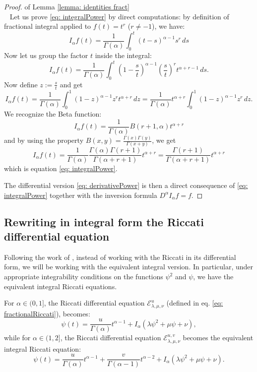 \documentclass[a4paper,italian,11pt]{book}
\theoremstyle{plain}
\theoremstyle{remark}
\theoremstyle{plain}
\begin{document}
\begin{proof} of Lemma \ref{lemma: identities fract}
\\\
\noindent
Let us prove \eqref{eq: integralPower} by direct computations:
by definition of fractional integral applied to $f(t)= t^r$ ($r \ne -1$), we have:
\begin{equation}
    \label{eq: UseleSSSforThen}
    I_\alpha f(t) = \frac{1}{\Gamma(\alpha)} \int_0^t (t-s)^{\alpha-1} s^r \, ds
\end{equation}
Now let us group the factor $t$ inside the integral:
$$ I_\alpha f(t) = \frac{1}{\Gamma(\alpha)} \int_0^t \left(1-\frac{s}{t} \right)^{\alpha-1} \left( \frac{s}{t} \right) ^r t^{\alpha+r-1}\, ds . $$
Now define $z:=\frac{s}{t}$ and get
$$ I_\alpha f(t) = \frac{1}{\Gamma(\alpha)} \int_0^1 (1-z)^{\alpha-1} z^r t^{\alpha+r} \, dz = \frac{1}{\Gamma(\alpha)}  t^{\alpha+r} \int_0^1 (1-z)^{\alpha-1} z^r \, dz.$$
We recognize the Beta function:
$$ I_\alpha f(t) = \frac{1}{\Gamma(\alpha)} B(r + 1, \alpha) t^{\alpha+r}$$
and by using the property $B(x,y) = \frac{\Gamma(x) \Gamma(y)}{\Gamma(x+y)}$, we get
$$ I_\alpha f(t) = \frac{1}{\Gamma(\alpha)} \frac{\Gamma(\alpha) \Gamma(r+1)}{\Gamma(\alpha+r+1)} t^{\alpha+r} = \frac{\Gamma(r+1)}{\Gamma(\alpha +r +1)} t^{\alpha+r}  $$
which is equation \eqref{eq: integralPower}.

The differential version \eqref{eq: derivativePower} is then a direct consequence of \eqref{eq: integralPower} together with the inversion formula $D^\alpha I_\alpha f = f$. 

\end{proof}

\subsection{Rewriting in integral form the Riccati differential equation}

Following the work of \cite{Main}, instead of working with the Riccati in its differential form, we will be working with the equivalent integral version. 
In particular, under appropriate integrability conditions on the functions $\psi^2$ and $\psi$, we have the equivalent integral Riccati equations.

For $\alpha \in (0,1]$, the Riccati differential equation $\mathcal{E} ^u_{\lambda , \mu , \nu}$ (defined in eq. \eqref{eq: fractionalRiccati}), becomes:
\begin{equation}
   \label{eq: integralRicc1}
   \psi(t) = \frac{u}{\Gamma(\alpha)} t^{\alpha-1} + I_\alpha (\lambda \psi^2 + \mu \psi + \nu ),
\end{equation}
while for $\alpha \in (1,2]$, the Riccati differential equation $\mathcal{E} ^ {u,v}_{\lambda, \mu , \nu }$ becomes the equivalent integral Riccati equation:
\begin{equation}
    \label{eq: integralRicc2}
     \psi(t) = \frac{u}{\Gamma(\alpha)} t^{\alpha-1} + \frac{v}{\Gamma(\alpha-1)} t^{\alpha - 2} + I_\alpha (\lambda \psi^2 + \mu \psi + \nu ).
\end{equation}
\end{document}
